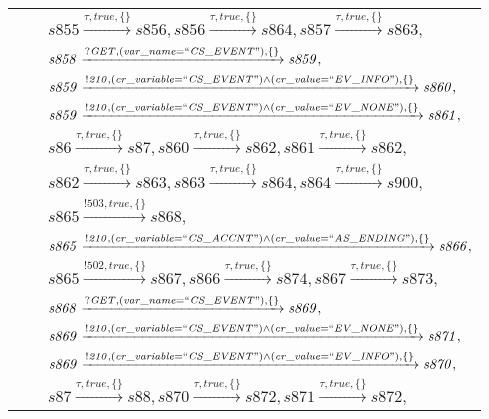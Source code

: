 \begin{tabular}{lcl}
& & $\mathit{s855}\xrightarrow{\mathit{\tau}, \mathit{true}, \{\}}\mathit{s856},\mathit{s856}\xrightarrow{\mathit{\tau}, \mathit{true}, \{\}}\mathit{s864},\mathit{s857}\xrightarrow{\mathit{\tau}, \mathit{true}, \{\}}\mathit{s863},$ \\
& & $\mathit{s858}\xrightarrow{\mathit{?GET}, \mathit{(var\_name = ``CS\_EVENT")}, \{\}}\mathit{s859},$ \\
& & $\mathit{s859}\xrightarrow{\mathit{!210}, \mathit{(cr\_variable = ``CS\_EVENT") \land (cr\_value = ``EV\_INFO")}, \{\}}\mathit{s860},$ \\
& & $\mathit{s859}\xrightarrow{\mathit{!210}, \mathit{(cr\_variable = ``CS\_EVENT") \land (cr\_value = ``EV\_NONE")}, \{\}}\mathit{s861},$ \\
& & $\mathit{s86}\xrightarrow{\mathit{\tau}, \mathit{true}, \{\}}\mathit{s87},\mathit{s860}\xrightarrow{\mathit{\tau}, \mathit{true}, \{\}}\mathit{s862},\mathit{s861}\xrightarrow{\mathit{\tau}, \mathit{true}, \{\}}\mathit{s862},$ \\
& & $\mathit{s862}\xrightarrow{\mathit{\tau}, \mathit{true}, \{\}}\mathit{s863},\mathit{s863}\xrightarrow{\mathit{\tau}, \mathit{true}, \{\}}\mathit{s864},\mathit{s864}\xrightarrow{\mathit{\tau}, \mathit{true}, \{\}}\mathit{s900},$ \\
& & $\mathit{s865}\xrightarrow{\mathit{!503}, \mathit{true}, \{\}}\mathit{s868},$ \\
& & $\mathit{s865}\xrightarrow{\mathit{!210}, \mathit{(cr\_variable = ``CS\_ACCNT") \land (cr\_value = ``AS\_ENDING")}, \{\}}\mathit{s866},$ \\
& & $\mathit{s865}\xrightarrow{\mathit{!502}, \mathit{true}, \{\}}\mathit{s867},\mathit{s866}\xrightarrow{\mathit{\tau}, \mathit{true}, \{\}}\mathit{s874},\mathit{s867}\xrightarrow{\mathit{\tau}, \mathit{true}, \{\}}\mathit{s873},$ \\
& & $\mathit{s868}\xrightarrow{\mathit{?GET}, \mathit{(var\_name = ``CS\_EVENT")}, \{\}}\mathit{s869},$ \\
& & $\mathit{s869}\xrightarrow{\mathit{!210}, \mathit{(cr\_variable = ``CS\_EVENT") \land (cr\_value = ``EV\_NONE")}, \{\}}\mathit{s871},$ \\
& & $\mathit{s869}\xrightarrow{\mathit{!210}, \mathit{(cr\_variable = ``CS\_EVENT") \land (cr\_value = ``EV\_INFO")}, \{\}}\mathit{s870},$ \\
& & $\mathit{s87}\xrightarrow{\mathit{\tau}, \mathit{true}, \{\}}\mathit{s88},\mathit{s870}\xrightarrow{\mathit{\tau}, \mathit{true}, \{\}}\mathit{s872},\mathit{s871}\xrightarrow{\mathit{\tau}, \mathit{true}, \{\}}\mathit{s872},$ \\

\end{tabular}
